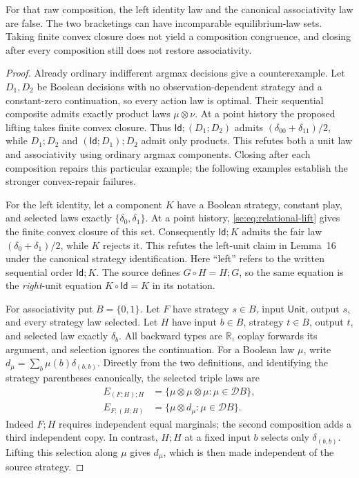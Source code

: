 \begin{proposition}
\label{se:prop:open-game-obstruction}
For that raw composition, the left identity law and the canonical
associativity law are false. The two bracketings can have incomparable
equilibrium-law sets. Taking finite convex closure does not yield a
composition congruence, and closing after every composition still does
not restore associativity.
\end{proposition}
\begin{proof}
Already ordinary indifferent argmax decisions give a counterexample.
Let $D_1,D_2$ be Boolean decisions with no observation-dependent strategy
and a constant-zero continuation, so every action law is optimal.
Their sequential composite admits exactly product laws
$\mu\otimes\nu$. At a point history the proposed lifting takes finite
convex closure. Thus $\mathsf{Id};(D_1;D_2)$ admits
$(\delta_{00}+\delta_{11})/2$, while $D_1;D_2$ and
$(\mathsf{Id};D_1);D_2$ admit only products. This refutes both a unit
law and associativity using ordinary argmax components. Closing after
each composition repairs this particular example; the following
examples establish the stronger convex-repair failures.

For the left identity, let a component $K$ have a Boolean strategy,
constant play, and selected laws exactly $\{\delta_0,\delta_1\}$.
At a point history, \eqref{se:eq:relational-lift} gives the finite convex
closure of this set. Consequently $\mathsf{Id};K$ admits the fair law
$(\delta_0+\delta_1)/2$, while $K$ rejects it. This refutes the left-unit
claim in Lemma~16 under the canonical strategy identification.
Here ``left'' refers to the written sequential order $\mathsf{Id};K$.
The source defines $G\circ H=H;G$, so the same equation is the
\emph{right}-unit equation $K\circ\mathsf{Id}=K$ in its notation.

For associativity put $B=\{0,1\}$. Let $F$ have strategy $s\in B$,
input $\mathsf{Unit}$, output $s$, and every strategy law selected.
Let $H$ have input $b\in B$, strategy $t\in B$, output $t$, and selected
law exactly $\delta_b$. All backward types are $\mathbb R$, coplay
forwards its argument, and selection ignores the continuation.
For a Boolean law $\mu$, write
$d_\mu=\sum_b\mu(b)\delta_{(b,b)}$.
Directly from the two definitions, and identifying the strategy
parentheses canonically, the selected triple laws are
\begin{align*}
 E_{(F;H);H}&=\{\mu\otimes\mu\otimes\mu:\mu\in\mathcal D B\},\\
 E_{F;(H;H)}&=\{\mu\otimes d_\mu:\mu\in\mathcal D B\}.
\end{align*}
Indeed $F;H$ requires independent equal marginals; the second composition
adds a third independent copy. In contrast, $H;H$ at a fixed input $b$
selects only $\delta_{(b,b)}$. Lifting this selection along $\mu$ gives
$d_\mu$, which is then made independent of the source strategy.


\end{proof}
